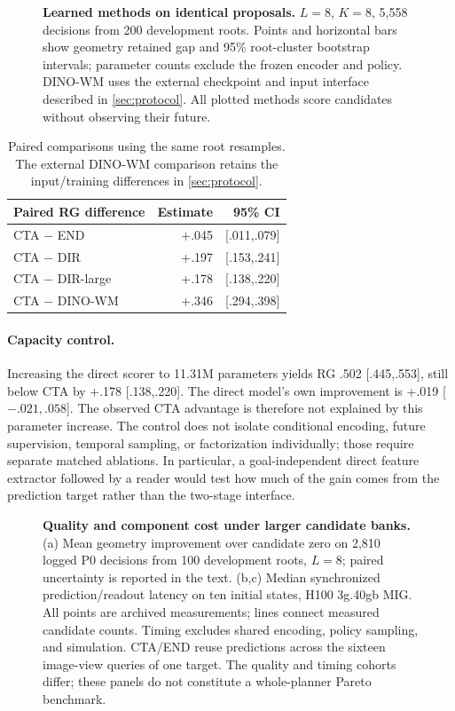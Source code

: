 \begin{figure}[t]
\centering
\caption{\textbf{Learned methods on identical proposals.} $L=8$, $K=8$, 5,558 decisions from 200 development roots. Points and horizontal bars show geometry retained gap and 95\% root-cluster bootstrap intervals; parameter counts exclude the frozen encoder and policy. DINO-WM uses the external checkpoint and input interface described in \cref{sec:protocol}. All plotted methods score candidates without observing their future.}
\label{fig:ranking}
\end{figure}
\begin{table}[t]
\centering\small
\begin{tabular}{lrr}
\toprule
Paired RG difference & Estimate & 95\% CI \\
\midrule
CTA $-$ END & +.045 & [.011,.079] \\
CTA $-$ DIR & +.197 & [.153,.241] \\
CTA $-$ DIR-large & +.178 & [.138,.220] \\
CTA $-$ DINO-WM & +.346 & [.294,.398] \\
\bottomrule
\end{tabular}
\caption{Paired comparisons using the same root resamples. The external DINO-WM comparison retains the input/training differences in \cref{sec:protocol}.}
\label{tab:pairedrank}
\end{table}

\paragraph{Capacity control.}
Increasing the direct scorer to 11.31M parameters yields RG .502 [.445,.553], still below CTA by +.178 [.138,.220]. The direct model's own improvement is +.019 [$-.021,.058$]. The observed CTA advantage is therefore not explained by this parameter increase. The control does not isolate conditional encoding, future supervision, temporal sampling, or factorization individually; those require separate matched ablations. In particular, a goal-independent direct feature extractor followed by a reader would test how much of the gain comes from the prediction target rather than the two-stage interface.

\begin{figure}[t]
\centering
\caption{\textbf{Quality and component cost under larger candidate banks.} (a) Mean geometry improvement over candidate zero on 2,810 logged P0 decisions from 100 development roots, $L=8$; paired uncertainty is reported in the text. (b,c) Median synchronized prediction/readout latency on ten initial states, H100 3g.40gb MIG. All points are archived measurements; lines connect measured candidate counts. Timing excludes shared encoding, policy sampling, and simulation. CTA/END reuse predictions across the sixteen image-view queries of one target. The quality and timing cohorts differ; these panels do not constitute a whole-planner Pareto benchmark.}
\label{fig:scaling}
\end{figure}

